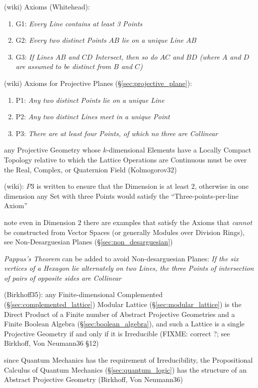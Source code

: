 (wiki) Axioms (Whitehead):
\begin{enumerate}
  \item G1: \emph{Every Line contains at least 3 Points}
  \item G2: \emph{Every two distinct Points $AB$ lie on a unique Line $AB$}
  \item G3: \emph{If Lines $AB$ and $CD$ Intersect, then so do $AC$ and $BD$
    (where $A$ and $D$ are assumed to be distinct from $B$ and $C$)}
\end{enumerate}

(wiki) Axioms for Projective Planes (\S\ref{sec:projective_plane}):
\begin{enumerate}
  \item P1: \emph{Any two distinct Points lie on a unique Line}
  \item P2: \emph{Any two distinct Lines meet in a unique Point}
  \item P3: \emph{There are at least four Points, of which no three are
    Collinear}
\end{enumerate}

any Projective Geometry whose $k$-dimensional Elements have a Locally Compact
Topology relative to which the Lattice Operations are Continuous must be over
the Real, Complex, or Quaternion Field (Kolmogorov32)

(wiki): $P3$ is written to ensure that the Dimension is at least $2$, otherwise
in one dimension any Set with three Points would satisfy the
``Three-points-per-line Axiom''

note even in Dimension $2$ there are examples that satisfy the Axioms that
\emph{cannot} be constructed from Vector Spaces (or generally Modules over
Division Rings), see Non-Desarguesian Planes (\S\ref{sec:non_desarguesian})

\emph{Pappus's Theorem} can be added to avoid Non-desarguesian Planes:
\emph{If the six vertices of a Hexagon lie alternately on two Lines, the three
Points of intersection of pairs of opposite sides are Collinear}

(Birkhoff35): any Finite-dimensional Complemented
(\S\ref{sec:complemented_lattice}) Modular Lattice (\S\ref{sec:modular_lattice})
is the Direct Product of a Finite number of Abstract Projective Geometries and a
Finite Boolean Algebra (\S\ref{sec:boolean_algebra}), and such a
Lattice is a single Projective Geometry if and only if it is Irreducible
(FIXME: correct ?; see Birkhoff, Von Neumann36 \S 12)

since Quantum Mechanics has the requirement of Irreducibility, the Propositional
Calculus of Quantum Mechanics (\S\ref{sec:quantum_logic}) has the structure of
an Abstract Projective Geometry (Birkhoff, Von Neumann36)

